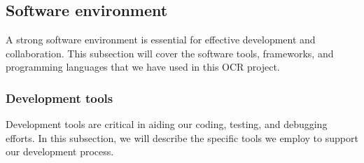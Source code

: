 \subsection{Software environment}
A strong software environment is essential for effective development and collaboration. This subsection will cover the software tools, frameworks, and programming languages that we have used in this OCR project.


\subsubsection{Development tools}
Development tools are critical in aiding our coding, testing, and debugging efforts. In this subsection, we will describe the specific tools we employ to support our development process.


